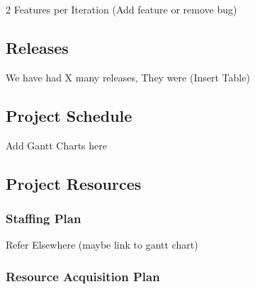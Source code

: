 2 Features per Iteration (Add feature or remove bug)



\subsection{Releases}

We have had X many releases, They were (Insert Table)


\subsection{Project Schedule}

Add Gantt Charts here



\subsection{Project Resources}



\subsubsection{Staffing Plan}

	Refer Elsewhere (maybe link to gantt chart)


\subsubsection{Resource Acquisition Plan}

